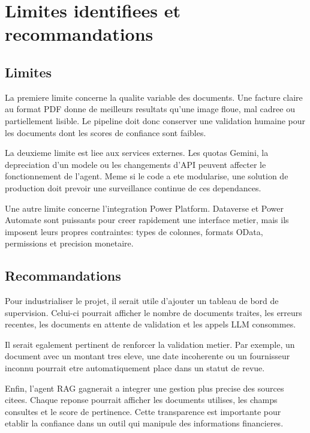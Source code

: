 \chapter{Limites identifiees et recommandations}
\label{chap:limites-recommandations}

\section{Limites}

La premiere limite concerne la qualite variable des documents. Une facture claire au format PDF donne de meilleurs resultats qu'une image floue, mal cadree ou partiellement lisible. Le pipeline doit donc conserver une validation humaine pour les documents dont les scores de confiance sont faibles.

La deuxieme limite est liee aux services externes. Les quotas Gemini, la depreciation d'un modele ou les changements d'API peuvent affecter le fonctionnement de l'agent. Meme si le code a ete modularise, une solution de production doit prevoir une surveillance continue de ces dependances.

Une autre limite concerne l'integration Power Platform. Dataverse et Power Automate sont puissants pour creer rapidement une interface metier, mais ils imposent leurs propres contraintes: types de colonnes, formats OData, permissions et precision monetaire.

\section{Recommandations}

Pour industrialiser le projet, il serait utile d'ajouter un tableau de bord de supervision. Celui-ci pourrait afficher le nombre de documents traites, les erreurs recentes, les documents en attente de validation et les appels LLM consommes.

Il serait egalement pertinent de renforcer la validation metier. Par exemple, un document avec un montant tres eleve, une date incoherente ou un fournisseur inconnu pourrait etre automatiquement place dans un statut de revue.

Enfin, l'agent RAG gagnerait a integrer une gestion plus precise des sources citees. Chaque reponse pourrait afficher les documents utilises, les champs consultes et le score de pertinence. Cette transparence est importante pour etablir la confiance dans un outil qui manipule des informations financieres.
